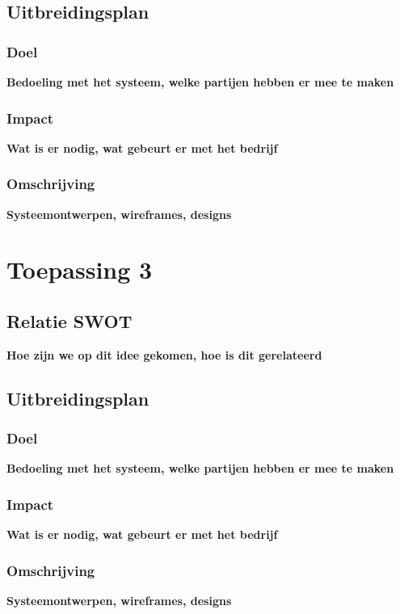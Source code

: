 \subsection{Uitbreidingsplan}

\subsubsection{Doel}
{\bf Bedoeling met het systeem, welke partijen hebben er mee te maken}

\subsubsection{Impact}
{\bf Wat is er nodig, wat gebeurt er met het bedrijf}

\subsubsection{Omschrijving}
{\bf Systeemontwerpen, wireframes, designs}

\section{Toepassing 3}

\subsection{Relatie SWOT}
{\bf Hoe zijn we op dit idee gekomen, hoe is dit gerelateerd}

\subsection{Uitbreidingsplan}

\subsubsection{Doel}
{\bf Bedoeling met het systeem, welke partijen hebben er mee te maken}

\subsubsection{Impact}
{\bf Wat is er nodig, wat gebeurt er met het bedrijf}

\subsubsection{Omschrijving}
{\bf Systeemontwerpen, wireframes, designs}
